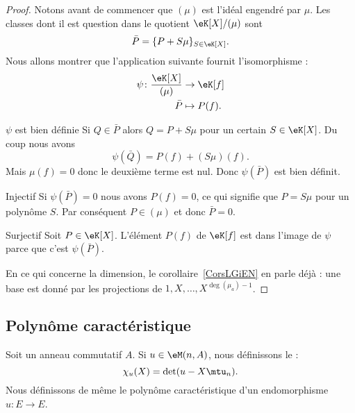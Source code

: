 \begin{proof}
    Notons avant de commencer que \( (\mu)\) est l'idéal engendré par \( \mu\). Les classes dont il est question dans le quotient \( \eK[X]/(\mu)\) sont
    \begin{equation}
        \bar P=\{ P+S\mu \}_{S\in \eK[X]}.
    \end{equation}
    Nous allons montrer que l'application suivante fournit l'isomorphisme :
    \begin{equation}
        \begin{aligned}
            \psi\colon \frac{ \eK[X] }{ (\mu) }&\to \eK[f] \\
            \bar P&\mapsto P(f).
        \end{aligned}
    \end{equation}
    \begin{subproof}
        \item[\( \psi\) est bien définie]
            Si \( Q\in \bar P\) alors \( Q=P+S\mu\) pour un certain \( S\in \eK[X]\). Du coup nous avons
            \begin{equation}
                \psi(\bar Q)=P(f)+(S\mu)(f).
            \end{equation}
            Mais \( \mu(f)=0\) donc le deuxième terme est nul. Donc \( \psi(\bar P)\) est bien définit.
        \item[Injectif]
            Si \( \psi(\bar P)=0\) nous avons \( P(f)=0\), ce qui signifie que \( P=S\mu\) pour un polynôme \( S\). Par conséquent \( P\in (\mu)\) et donc \( \bar P=0\).
        \item[Surjectif]
            Soit \( P\in \eK[X]\). L'élément \( P(f) \) de \( \eK[f]\) est dans l'image de \( \psi\) parce que c'est \( \psi(\bar P)\).
    \end{subproof}
    En ce qui concerne la dimension, le corollaire~\ref{CorsLGiEN} en parle déjà : une base est donné par les projections de \( 1,X,\ldots, X^{\deg(\mu_a)-1}\).
\end{proof}

\subsection{Polynôme caractéristique}

\begin{definition}  \label{DefOWQooXbybYD}
    Soit un anneau commutatif \( A\). Si \( u\in\eM(n,A)\), nous définissons le  :
    \begin{equation}    \label{Eqkxbdfu}
        \chi_u(X)=\det(u-X\mtu_n).
    \end{equation}
    Nous définissons de même le polynôme caractéristique d'un endomorphisme \( u\colon E\to E\).
\end{definition}

